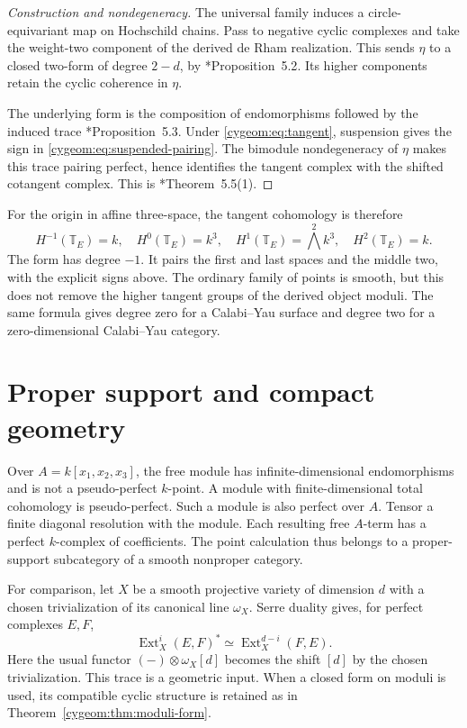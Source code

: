 \begin{proof}[Construction and nondegeneracy]
The universal family induces a circle-equivariant map on Hochschild
chains. Pass to negative cyclic complexes and take the weight-two
component of the derived de Rham realization. This sends $\eta$ to a
closed two-form of degree $2-d$, by
\cite{cygeom:BD-moduli}*{Proposition~5.2}. Its higher components
retain the cyclic coherence in $\eta$.

The underlying form is the
composition of endomorphisms followed by the induced trace
\cite{cygeom:BD-moduli}*{Proposition~5.3}. Under
\eqref{cygeom:eq:tangent}, suspension gives the sign in
\eqref{cygeom:eq:suspended-pairing}. The bimodule nondegeneracy of
$\eta$ makes this trace pairing perfect, hence identifies the tangent
complex with the shifted cotangent complex. This is
\cite{cygeom:BD-moduli}*{Theorem~5.5(1)}.
\end{proof}

For the origin in affine three-space, the tangent cohomology is therefore
\[
 H^{-1}(\mathbb T_E)=k,\quad
 H^0(\mathbb T_E)=k^3,\quad
 H^1(\mathbb T_E)=\bigwedge^2 k^3,\quad
 H^2(\mathbb T_E)=k.
\]
The form has degree $-1$. It pairs the first and last spaces and the
middle two, with the explicit signs above. The ordinary family of points
is smooth, but this does not remove the higher tangent groups of the
derived object moduli. The same formula gives degree zero for a
Calabi--Yau surface and degree two for a zero-dimensional Calabi--Yau
category.

\section{Proper support and compact geometry}
\label{cygeom:sec:support}

Over $A=k[x_1,x_2,x_3]$, the free module has infinite-dimensional
endomorphisms and is not a pseudo-perfect $k$-point. A module with
finite-dimensional total cohomology is pseudo-perfect. Such a module is
also perfect over $A$. Tensor a finite diagonal
resolution with the module. Each resulting free $A$-term has a
perfect $k$-complex of coefficients. The point calculation thus belongs
to a proper-support subcategory of a smooth nonproper category.

For comparison, let $X$ be a smooth projective variety of dimension
$d$ with a chosen trivialization of its canonical line $\omega_X$.
Serre duality gives, for perfect complexes $E,F$,
\begin{equation}\label{cygeom:eq:serre}
 \operatorname{Ext}^i_X(E,F)^*
   \simeq\operatorname{Ext}^{d-i}_X(F,E).
\end{equation}
Here the usual functor $(-)\otimes\omega_X[d]$ becomes the shift
$[d]$ by the chosen trivialization. This trace is a geometric input.
When a closed form on moduli is used, its compatible cyclic structure
is retained as in Theorem~\ref{cygeom:thm:moduli-form}.

